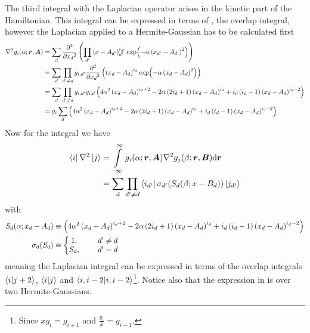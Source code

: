     The third integral with the Laplacian operator arises in the kinetic part
    of the Hamiltonian. This integral can be expressed in terms of
    , the overlap integral, however the Laplacian applied
    to a Hermite-Gaussian has to be calculated first
        \begin{align}
            \nabla^2 g_i(\alpha;\blds{r},\blds{A}) &= \sum_d \prd{x_d}[][2]
            \left(\prod_{d'} \left(x - A_{d'}\right)^{i_{d'}}_{d'} \exp(-\alpha
            \left(x_{d'} - A_{d'}\right)^2)\right)\nonumber \\
            &= \sum_d \prod_{d'\neq d} g_{i,d'} \prd{x_d}[][2]\left(\left(x_d -
            A_d\right)^{i_d} \exp(-\alpha \left(x_d - A_d\right)^2)\right)
            \nonumber \\
            &= \sum_d \prod_{d'\neq d} g_{i,d'} g_{i,d}
            \left(4\alpha^2\left(x_d-A_d\right)^{i_d+2} -
            2\alpha\left(2i_d+1\right)\left(x_d-A_d\right)^{i_d} +
            i_d\left(i_d-1\right)\left(x_d-A_d\right)^{i_d-2}\right) \nonumber
            \\
            &= g_i\sum_d \left(4\alpha^2\left(x_d-A_d\right)^{i_d+2} -
            2\alpha\left(2i_d+1\right)\left(x_d-A_d\right)^{i_d} +
            i_d\left(i_d-1\right)\left(x_d-A_d\right)^{i_d-2}\right)
        \end{align}
    Now for the integral we have
        \begin{align}
            \bra{i}\nabla^2\ket{j} &= \int\limits^{\infty}_{-\infty}
            g_i(\alpha;\boldsymbol{{r}},\boldsymbol{{A}})\nabla^2g_j(\beta;\boldsymbol{{r}},\boldsymbol{{B}}) 
            \mathrm{d}\boldsymbol{{r}} \nonumber \\
            &= \sum_d\prod_{d'\neq d}
            \bra{i_{d'}}\sigma_{d'}(S_d(\beta;x-B_d))\ket{j_{d'}}
            \label{eq:laplacianIntegral}
        \end{align}
    with
        \begin{equation}
            \begin{aligned}
                S_d(\alpha;x_d-A_d) &\equiv
                \left(4\alpha^2\left(x_d-A_d\right)^{i_d+2} -
                2\alpha\left(2i_d+1\right)\left(x_d-A_d\right)^{i_d} +
                i_d\left(i_d-1\right)\left(x_d-A_d\right)^{i_d-2}\right) \\
                \sigma_d(S_d) &\equiv \left\{\begin{matrix}
                                            1,&\indent d' \neq d \\
                                            S_d,&\indent d' = d
                                            \end{matrix}
                                        \right.
            \end{aligned}
        \end{equation}
    meaning the Laplacian integral can be expressed in terms of the overlap
    integrals $\braket{i}{j+2}$, $\braket{i}{j}$ and
    $\braket{i,i-2}$\footnote{Since $xg_i=g_{i+1}$ and
    $\frac{g_i}{x}=g_{i-1}$.}. Notice also that the expression in
     is over two Hermite-Gaussians. \\

